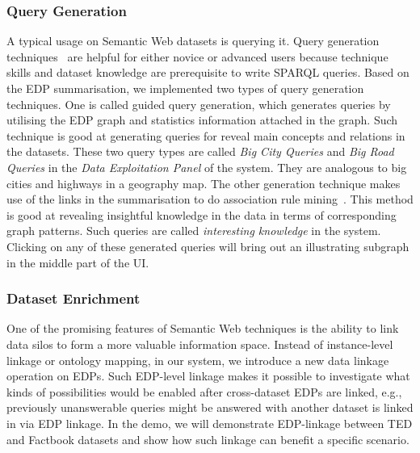 \subsubsection{Query Generation}
A typical usage on Semantic Web datasets is querying it. Query generation techniques~\cite{pan2013query} are helpful for either novice or advanced users because technique skills and dataset knowledge are prerequisite to write SPARQL queries. Based on the EDP summarisation, we implemented two types of query generation techniques. One is called guided query generation, which generates queries by utilising the EDP graph and statistics information attached in the graph. Such technique is good at generating queries for reveal main concepts and relations in the datasets. These two query types are called \emph{Big City Queries} and \emph{Big Road Queries} in the \emph{Data Exploitation Panel} of the system. They are analogous to big cities and highways in a geography map. The other generation technique makes use of the links in the summarisation to do association rule mining~\cite{pan2013query}. This method is good at revealing insightful knowledge in the data in terms of corresponding graph patterns. Such queries are called \emph{interesting knowledge} in the system. Clicking on any of these generated queries will bring out an illustrating subgraph in the middle part of the UI.  

\vspace{-3ex}
\subsubsection{Dataset Enrichment}
One of the promising features of Semantic Web techniques is the ability to link data silos to form a more valuable information space. Instead of instance-level linkage or ontology mapping, in our system, we introduce a new data linkage operation on EDPs. Such EDP-level linkage makes it possible to investigate what kinds of possibilities would be enabled after cross-dataset EDPs are linked, e.g., previously unanswerable queries might be answered with another dataset is linked in via EDP linkage. In the demo, we will demonstrate EDP-linkage between TED and Factbook datasets and show how such linkage can benefit a specific scenario.
